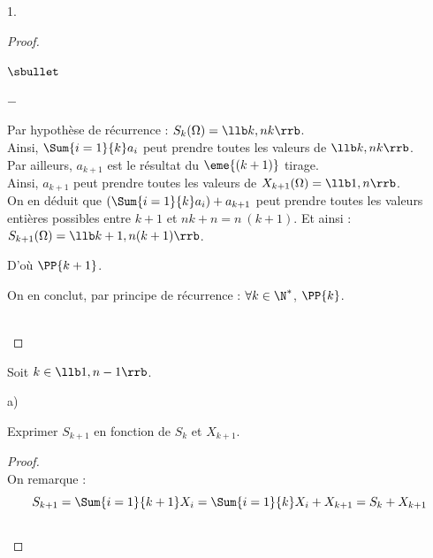 \documentclass[11pt]{article}%
\begin{document}
\begin{noliste}{1.}
\begin{proof}
\begin{remark}
\begin{noliste}{$\sbullet$}
\begin{noliste}{\fitem}
\begin{noliste}{$-$}
          \item Par hypothèse de récurrence : $S_k(\Omega) = \llb k,
            nk\rrb$.\\
            Ainsi, $\Sum{i=1}{k} a_i$ peut prendre toutes les valeurs
            de $\llb k, nk \rrb$.\\
            Par ailleurs, $a_{k+1}$ est le résultat du $\eme{(k+1)}$
            tirage.\\
            Ainsi, $a_{k+1}$ peut prendre toutes les valeurs de
            $X_{k+1}(\Omega)=\llb 1,n\rrb$.\\[.2cm]
            On en déduit que $\left( \Sum{i=1}{k} a_i \right) +
            a_{k+1}$ peut prendre toutes les valeurs entières
            possibles entre $k + 1$ et $nk + n = n \ (k+1)$.
            Et ainsi : $S_{k+1}(\Omega) = \llb k+1, n(k+1)\rrb$.
          \end{noliste}
          D'où $\PP{k+1}$.
        \end{noliste}
        On en conclut, par principe de récurrence : $\forall k \in
        \N^*$, $\PP{k}$.
      \end{noliste}
    \end{remark}~\\[-1.4cm]
  \end{proof}


\newpage


\item Soit $k\in\llb 1,n-1\rrb$.
  \begin{noliste}{a)}
  \item Exprimer $S_{k+1}$ en fonction de $S_k$ et $X_{k+1}$.
    
    \begin{proof}~\\
      On remarque :
      \[
      S_{k+1}=\Sum{i=1}{k+1} X_i = \Sum{i=1}{k} X_i + X_{k+1} = 
      S_k+X_{k+1}
      \]
      ~\\[-1cm]
    \end{proof}
    

\end{noliste}
\end{noliste}
\end{document}
